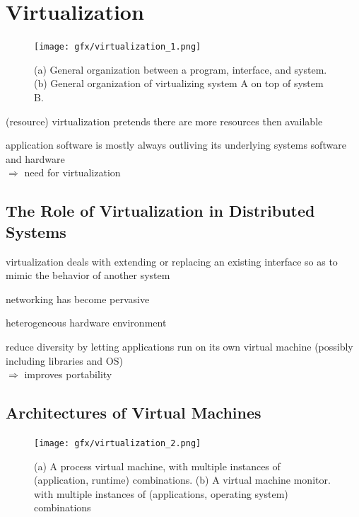 \section{Virtualization}

\begin{figure}[h]
	\centering
	\texttt{[image: gfx/virtualization\_1.png]}
	\caption{ (a) General organization between a program, interface, and system. 
			 (b) General organization of virtualizing system A on top of system B.}
	\label{img:virtualization_1}
\end{figure}

\begin{compactitem}
	\item (resource) virtualization pretends there are more resources then available
	\item application software is mostly always outliving its underlying systems software and hardware \\
	$\Rightarrow$ need for virtualization
\end{compactitem}


\subsection{The Role of Virtualization in Distributed Systems}

\begin{compactitem}
	\item virtualization deals with extending or replacing an existing interface so as to mimic the behavior of another system
	\item networking has become pervasive
	\begin{compactitem}
		\item heterogeneous hardware environment
		\item reduce diversity by letting applications run on its own virtual machine (possibly including libraries and OS)\\
		$\Rightarrow$ improves portability
	\end{compactitem}
\end{compactitem}


\subsection{Architectures of Virtual Machines}

\begin{figure}[h]
	\centering
	\texttt{[image: gfx/virtualization\_2.png]}
	\caption{ (a) A process virtual machine, with multiple instances of (application, runtime) combinations. 
			 (b) A virtual machine monitor. with multiple instances of (applications, operating system) combinations}
	\label{img:virtualization_2}
\end{figure}


